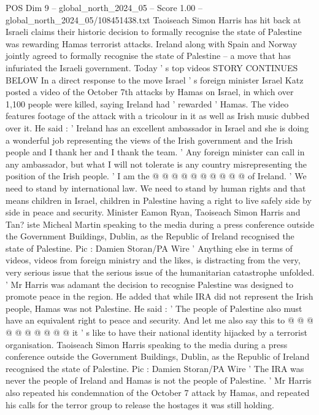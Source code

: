 \begin{textsample}{POS Dim 9 – global\_north\_2024\_05 – Score 1.00 – global\_north\_2024\_05/108451438.txt}  \label{ex:f9_pos_297}
Taoiseach Simon Harris has hit back at Israeli claims their historic decision to formally recognise the state of Palestine was rewarding Hamas terrorist attacks.
Ireland along with Spain and Norway jointly agreed to formally recognise the state of Palestine -- a move that has infuriated the Israeli government.
Today ' s top videos STORY CONTINUES BELOW In a direct response to the move Israel ' s foreign minister Israel Katz posted a video of the October 7th attacks by Hamas on Israel, in which over 1,100 people were killed, saying Ireland had ' rewarded ' Hamas.
The video features footage of the attack with a tricolour in it as well as Irish music dubbed over it.
He said : ' Ireland has an excellent ambassador in Israel and she is doing a wonderful job representing the views of the Irish government and the Irish people and I thank her and I thank the team. ' Any foreign minister can call in any ambassador, but what I will not tolerate is any country misrepresenting the position of the Irish people. ' I am the @ @ @ @ @ @ @ @ @ @ of Ireland. ' We need to stand by international law.
We need to stand by human rights and that means children in Israel, children in Palestine having a right to live safely side by side in peace and security.
Minister Eamon Ryan, Taoiseach Simon Harris and Tan? iste Micheal Martin speaking to the media during a press conference outside the Government Buildings, Dublin, as the Republic of Ireland recognised the state of Palestine.
Pic : Damien Storan/PA Wire ' Anything else in terms of videos, videos from foreign ministry and the likes, is distracting from the very, very serious issue that the serious issue of the humanitarian catastrophe unfolded. ' Mr Harris was adamant the decision to recognise Palestine was designed to promote peace in the region.
He added that while IRA did not represent the Irish people, Hamas was not Palestine.
He said : ' The people of Palestine also must have an equivalent right to peace and security.
And let me also say this to @ @ @ @ @ @ @ @ @ @ it ' s like to have their national identity hijacked by a terrorist organisation.
Taoiseach Simon Harris speaking to the media during a press conference outside the Government Buildings, Dublin, as the Republic of Ireland recognised the state of Palestine.
Pic : Damien Storan/PA Wire ' The IRA was never the people of Ireland and Hamas is not the people of Palestine. ' Mr Harris also repeated his condemnation of the October 7 attack by Hamas, and repeated his calls for the terror group to release the hostages it was still holding.

\end{textsample}
